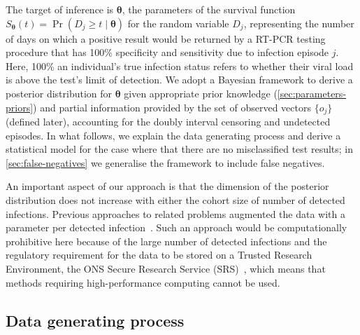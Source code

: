 \documentclass[12pt]{article}
\DeclareMathOperator{\prob}{\mathrm{Pr}}
\renewcommand{\vec}[1]{\bm{#1}}
\begin{document}
The target of inference is $\vec{\theta}$, the parameters of the survival function $S_{\vec{\theta}}(t) = \prob(D_j \geq t \mid \vec\theta)$ for the random variable $D_j$, representing the number of days on which a positive result would be returned by a RT-PCR testing procedure that has 100\% specificity and sensitivity due to infection episode $j$.
Here, 100\% an individual's true infection status refers to whether their viral load is above the test's limit of detection.
We adopt a Bayesian framework to derive a posterior distribution for $\vec{\theta}$ given appropriate prior knowledge (\cref{sec:parameters-priors}) and partial information provided by the set of observed vectors $\{ o_j \}$ (defined later), accounting for the doubly interval censoring and undetected episodes.
In what follows, we explain the data generating process and derive a statistical model for the case where that there are no misclassified test results; in \cref{sec:false-negatives} we generalise the framework to include false negatives.

An important aspect of our approach is that the dimension of the posterior distribution does not increase with either the cohort size of number of detected infections.
Previous approaches to related problems augmented the data with a parameter per detected infection~\citep{heBayesiana,heBayesian,caoModeling}.
Such an approach would be computationally prohibitive here because of the large number of detected infections and the regulatory requirement for the data to be stored on a Trusted Research Environment, the ONS Secure Research Service (SRS)~\citep{onsSRS}, which means that methods requiring high-performance computing cannot be used.

\subsection{Data generating process}
\end{document}
